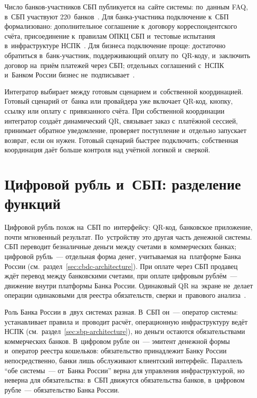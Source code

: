 Число банков-участников СБП публикуется на~сайте системы: по~данным FAQ,
в~СБП участвуют 220~банков~\cite{sbp-faq-general}. Для банка-участника
подключение к~СБП формализовано: дополнительное
соглашение к~договору корреспондентского счёта, присоединение к~правилам ОПКЦ
СБП и~тестовые испытания в~инфраструктуре НСПК~\cite{cbr-sbp-actions}. Для
бизнеса подключение проще: достаточно обратиться в~банк-участник, поддерживающий
оплату по~QR-коду, и~заключить договор на~приём платежей через СБП; отдельных
соглашений с~НСПК и~Банком России бизнес не~подписывает~\cite{sbp-faq-business}.

Интегратор выбирает между готовым сценарием и~собственной координацией. Готовый
сценарий от~банка или провайдера уже включает QR-код, кнопку, ссылку или оплату
с~привязанного счёта. При собственной координации интегратор создаёт
динамический QR, связывает заказ с~платёжной сессией, принимает обратное
уведомление, проверяет поступление и~отдельно запускает возврат, если он
нужен. Готовый сценарий быстрее подключить; собственная координация даёт больше
контроля над учётной логикой и~сверкой.

\section{Цифровой рубль и~СБП: разделение функций}\label{sec:sbp-cbdc}

Цифровой рубль похож на~СБП по~интерфейсу: QR-код, банковское приложение, почти
мгновенный результат. По~устройству это другая часть денежной системы. СБП
переводит безналичные деньги между счетами в~коммерческих банках; цифровой
рубль~--- отдельная форма денег, учитываемая на~платформе Банка России
(см.~раздел~\ref{sec:cbdc-architecture}). При оплате через СБП продавец ждёт
перевод между банковскими счетами, при оплате цифровым рублём~--- движение
внутри платформы Банка России. Одинаковый QR на~экране не~делает операции
одинаковыми для реестра обязательств, сверки и~правового
анализа~\cite{cbr-digital-ruble}.

Роль Банка России в~двух системах разная. В~СБП он~--- оператор
системы: устанавливает правила и~проводит расчёт, операционную инфраструктуру
ведёт НСПК (см.~раздел~\ref{sec:sbp-architecture}), но деньги остаются
обязательствами коммерческих банков. В~цифровом рубле он~--- эмитент денежной
формы и~оператор реестра кошельков: обязательство принадлежит Банку России
непосредственно, банки лишь обслуживают клиентский интерфейс. Параллель
\enquote{обе системы~--- от~Банка России} верна для управления
инфраструктурой, но неверна для обязательства: в~СБП движутся обязательства
банков, в~цифровом рубле~--- обязательство Банка России.
